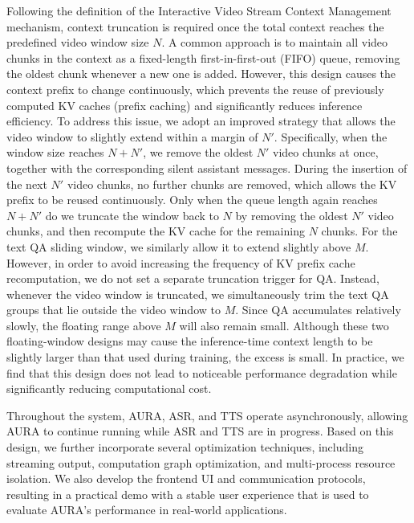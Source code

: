 Following the definition of the Interactive Video Stream Context Management mechanism, context truncation is required once the total context reaches the predefined video window size $N$. A common approach is to maintain all video chunks in the context as a fixed-length first-in-first-out (FIFO) queue, removing the oldest chunk whenever a new one is added. However, this design causes the context prefix to change continuously, which prevents the reuse of previously computed KV caches (prefix caching) and significantly reduces inference efficiency. To address this issue, we adopt an improved strategy that allows the video window to slightly extend within a margin of $N'$. Specifically, when the window size reaches $N+N'$, we remove the oldest $N'$ video chunks at once, together with the corresponding silent assistant messages. During the insertion of the next $N'$ video chunks, no further chunks are removed, which allows the KV prefix to be reused continuously. Only when the queue length again reaches $N + N'$ do we truncate the window back to $N$ by removing the oldest $N'$ video chunks, and then recompute the KV cache for the remaining $N$ chunks. For the text QA sliding window, we similarly allow it to extend slightly above $M$. However, in order to avoid increasing the frequency of KV prefix cache recomputation, we do not set a separate truncation trigger for QA. Instead, whenever the video window is truncated, we simultaneously trim the text QA groups that lie outside the video window to $M$. Since QA accumulates relatively slowly, the floating range above $M$ will also remain small. Although these two floating-window designs may cause the inference-time context length to be slightly larger than that used during training, the excess is small. In practice, we find that this design does not lead to noticeable performance degradation while significantly reducing computational cost.

Throughout the system, AURA, ASR, and TTS operate asynchronously, allowing AURA to continue running while ASR and TTS are in progress. Based on this design, we further incorporate several optimization techniques, including streaming output, computation graph optimization, and multi-process resource isolation. We also develop the frontend UI and communication protocols, resulting in a practical demo with a stable user experience that is used to evaluate AURA’s performance in real-world applications.
